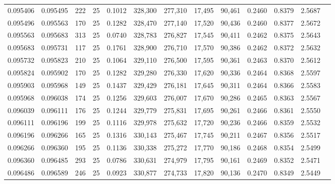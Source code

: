 \begin{tabular}{rrrrrrrrrrrrr}
0.095406 & 0.095495 &   222 &  25 &                                     0.1012 & 328,300 & 277,310 &  17,495 &  90,461 & 0.2460 & 0.8379 & 2.5687 \\
0.095496 & 0.095563 &   170 &  25 &                                     0.1282 & 328,470 & 277,140 &  17,520 &  90,436 & 0.2460 & 0.8377 & 2.5672 \\
0.095563 & 0.095683 &   313 &  25 &                                     0.0740 & 328,783 & 276,827 &  17,545 &  90,411 & 0.2462 & 0.8375 & 2.5643 \\
0.095683 & 0.095731 &   117 &  25 &                                     0.1761 & 328,900 & 276,710 &  17,570 &  90,386 & 0.2462 & 0.8372 & 2.5632 \\
0.095732 & 0.095823 &   210 &  25 &                                     0.1064 & 329,110 & 276,500 &  17,595 &  90,361 & 0.2463 & 0.8370 & 2.5612 \\
0.095824 & 0.095902 &   170 &  25 &                                     0.1282 & 329,280 & 276,330 &  17,620 &  90,336 & 0.2464 & 0.8368 & 2.5597 \\
0.095903 & 0.095968 &   149 &  25 &                                     0.1437 & 329,429 & 276,181 &  17,645 &  90,311 & 0.2464 & 0.8366 & 2.5583 \\
0.095968 & 0.096038 &   174 &  25 &                                     0.1256 & 329,603 & 276,007 &  17,670 &  90,286 & 0.2465 & 0.8363 & 2.5567 \\
0.096039 & 0.096111 &   176 &  25 &                                     0.1244 & 329,779 & 275,831 &  17,695 &  90,261 & 0.2466 & 0.8361 & 2.5550 \\
0.096111 & 0.096196 &   199 &  25 &                                     0.1116 & 329,978 & 275,632 &  17,720 &  90,236 & 0.2466 & 0.8359 & 2.5532 \\
0.096196 & 0.096266 &   165 &  25 &                                     0.1316 & 330,143 & 275,467 &  17,745 &  90,211 & 0.2467 & 0.8356 & 2.5517 \\
0.096266 & 0.096360 &   195 &  25 &                                     0.1136 & 330,338 & 275,272 &  17,770 &  90,186 & 0.2468 & 0.8354 & 2.5499 \\
0.096360 & 0.096485 &   293 &  25 &                                     0.0786 & 330,631 & 274,979 &  17,795 &  90,161 & 0.2469 & 0.8352 & 2.5471 \\
0.096486 & 0.096589 &   246 &  25 &                                     0.0923 & 330,877 & 274,733 &  17,820 &  90,136 & 0.2470 & 0.8349 & 2.5449 \\

\end{tabular}
